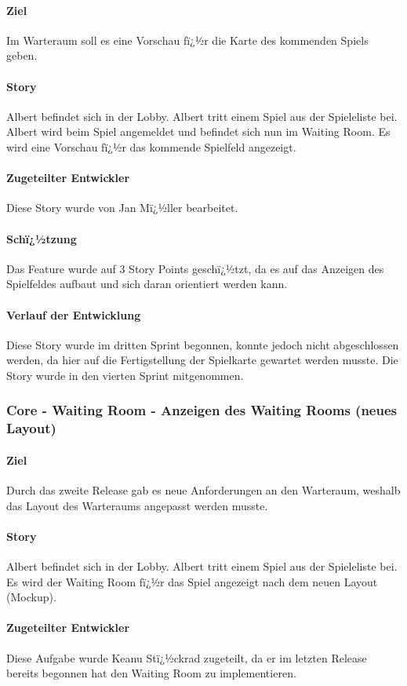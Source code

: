 \documentclass[12pt, titlepage]{scrartcl}
\begin{document}
		\paragraph{Ziel} Im Warteraum soll es eine Vorschau fï¿½r die Karte des kommenden Spiels geben.
		\paragraph{Story} Albert befindet sich in der Lobby. Albert tritt einem Spiel aus der Spieleliste bei. Albert wird beim Spiel angemeldet und befindet sich nun im Waiting Room. Es wird eine Vorschau fï¿½r das kommende Spielfeld angezeigt.
		\paragraph{Zugeteilter Entwickler} Diese Story wurde von Jan Mï¿½ller bearbeitet.
		\paragraph{Schï¿½tzung}
		Das Feature wurde auf 3 Story Points geschï¿½tzt, da es auf das Anzeigen des Spielfeldes aufbaut und sich daran orientiert werden kann.
		\paragraph{Verlauf der Entwicklung} 
		Diese Story wurde im dritten Sprint begonnen, konnte jedoch nicht abgeschlossen werden, da hier auf die Fertigstellung der Spielkarte gewartet werden musste. Die Story wurde in den vierten Sprint mitgenommen.
		
		\subsubsection{Core - Waiting Room - Anzeigen des Waiting Rooms (neues Layout)}
		\paragraph{Ziel} Durch das zweite Release gab es neue Anforderungen an den Warteraum, weshalb das Layout des Warteraums angepasst werden musste.
		\paragraph{Story} Albert befindet sich in der Lobby. Albert tritt einem Spiel aus der Spieleliste bei. Es wird der Waiting Room fï¿½r das Spiel angezeigt nach dem neuen Layout (Mockup).
		\paragraph{Zugeteilter Entwickler} Diese Aufgabe wurde Keanu Stï¿½ckrad zugeteilt, da er im letzten Release bereits begonnen hat den Waiting Room zu implementieren.
\end{document}

